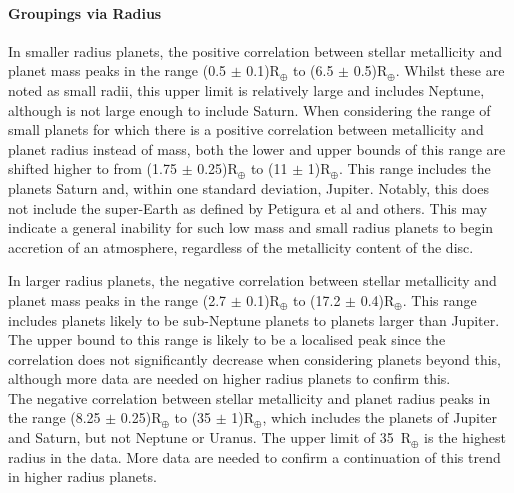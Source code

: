 \documentclass[a4paper,twocolumn,12pt]{article}
\begin{document}
\paragraph{Groupings via Radius}
In smaller radius planets, the positive correlation between stellar metallicity and planet mass peaks in the range (0.5 $\pm$ 0.1)R$_\oplus$ to (6.5 $\pm$ 0.5)R$_\oplus$. Whilst these are noted as small radii, this upper limit is relatively large and includes Neptune, although is not large enough to include Saturn. When considering the range of small planets for which there is a positive correlation between metallicity and planet radius instead of mass, both the lower and upper bounds of this range are shifted higher to from (1.75 $\pm$ 0.25)R$_\oplus$ to (11 $\pm$ 1)R$_\oplus$. This range includes the planets Saturn and, within one standard deviation, Jupiter. Notably, this does not include the super-Earth as defined by Petigura et al and others. This may indicate a general inability for such low mass and small radius planets to begin accretion of an atmosphere, regardless of the metallicity content of the disc.

In larger radius planets, the negative correlation between stellar metallicity and planet mass peaks in the range (2.7 $\pm$ 0.1)R$_\oplus$ to (17.2 $\pm$ 0.4)R$_\oplus$. This range includes planets likely to be sub-Neptune planets to planets larger than Jupiter. The upper bound to this range is likely to be a localised peak since the correlation does not significantly decrease when considering planets beyond this, although more data are needed on higher radius planets to confirm this.\\
The negative correlation between stellar metallicity and planet radius peaks in the range (8.25 $\pm$ 0.25)R$_\oplus$ to (35 $\pm$ 1)R$_\oplus$, which includes the planets of Jupiter and Saturn, but not Neptune or Uranus. The upper limit of 35~R$_\oplus$ is the highest radius in the data. More data are needed to confirm a continuation of this trend in higher radius planets.
\end{document}
